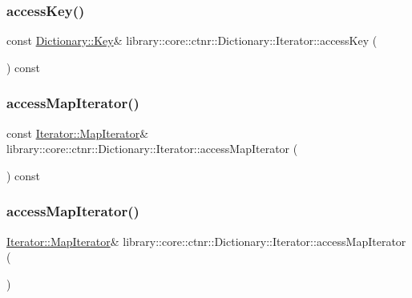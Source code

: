 \subsubsection{\texorpdfstring{access\+Key()}{accessKey()}}
{\footnotesize\ttfamily const \hyperlink{classlibrary_1_1core_1_1ctnr_1_1_dictionary_a987cae687cce70d81a2a483c5e05e842}{Dictionary\+::\+Key}\& library\+::core\+::ctnr\+::\+Dictionary\+::\+Iterator\+::access\+Key (\begin{DoxyParamCaption}{ }\end{DoxyParamCaption}) const}

\mbox{\label{classlibrary_1_1core_1_1ctnr_1_1_dictionary_1_1_iterator_a202f6a93a302e94078a33c1bcc999deb}} 
\subsubsection{\texorpdfstring{access\+Map\+Iterator()}{accessMapIterator()}\hspace{0.1cm}{\footnotesize\ttfamily [1/2]}}
{\footnotesize\ttfamily const \hyperlink{classlibrary_1_1core_1_1ctnr_1_1_dictionary_1_1_iterator_a990205e908ac1bafcd754993219b805e}{Iterator\+::\+Map\+Iterator}\& library\+::core\+::ctnr\+::\+Dictionary\+::\+Iterator\+::access\+Map\+Iterator (\begin{DoxyParamCaption}{ }\end{DoxyParamCaption}) const}

\mbox{\label{classlibrary_1_1core_1_1ctnr_1_1_dictionary_1_1_iterator_acbc6831522ba983453d99696b58e055c}} 
\subsubsection{\texorpdfstring{access\+Map\+Iterator()}{accessMapIterator()}\hspace{0.1cm}{\footnotesize\ttfamily [2/2]}}
{\footnotesize\ttfamily \hyperlink{classlibrary_1_1core_1_1ctnr_1_1_dictionary_1_1_iterator_a990205e908ac1bafcd754993219b805e}{Iterator\+::\+Map\+Iterator}\& library\+::core\+::ctnr\+::\+Dictionary\+::\+Iterator\+::access\+Map\+Iterator (\begin{DoxyParamCaption}{ }\end{DoxyParamCaption})}

